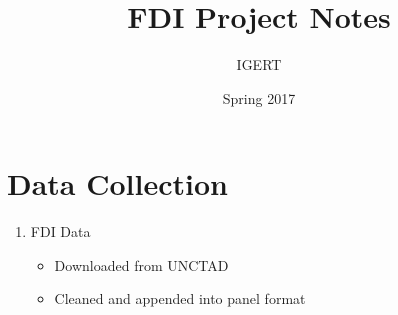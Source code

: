 \documentclass{article}
\begin{document}
\title{FDI Project Notes}
\author{IGERT}
\date{Spring 2017}
\maketitle

\section{Data Collection}



\begin{enumerate}
	\item {FDI Data}
	\begin{itemize}
		\item{Downloaded from UNCTAD}
		\item{Cleaned and appended into panel format}
	\end{itemize}
\end{enumerate}
\end{document}
